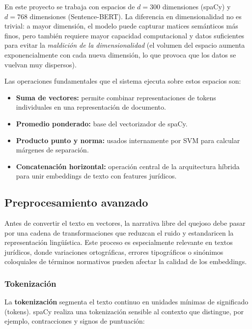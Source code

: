 En este proyecto se trabaja con espacios de $d = 300$ dimensiones (spaCy) y
$d = 768$ dimensiones (Sentence-BERT). La diferencia en dimensionalidad no es
trivial: a mayor dimensión, el modelo puede capturar matices semánticos más
finos, pero también requiere mayor capacidad computacional y datos suficientes
para evitar la \textit{maldición de la dimensionalidad} (el volumen del espacio aumenta exponencialmente con cada nueva dimensión, lo que provoca que los datos se vuelvan muy dispersos).

Las operaciones fundamentales que el sistema ejecuta sobre estos espacios son:

\begin{itemize}
  \item \textbf{Suma de vectores:} permite combinar representaciones de tokens
        individuales en una representación de documento.
  \item \textbf{Promedio ponderado:} base del vectorizador de spaCy.
  \item \textbf{Producto punto y norma:} usados internamente por SVM para
        calcular márgenes de separación.
  \item \textbf{Concatenación horizontal:} operación central de la arquitectura
        híbrida para unir embeddings de texto con features jurídicos.
\end{itemize}

\subsection{Preprocesamiento avanzado}

Antes de convertir el texto en vectores, la narrativa libre del quejoso debe
pasar por una cadena de transformaciones que reduzcan el ruido y estandaricen
la representación lingüística. Este proceso es especialmente relevante en textos
jurídicos, donde variaciones ortográficas, errores tipográficos o sinónimos
coloquiales de términos normativos pueden afectar la calidad de los embeddings.

\subsubsection*{Tokenización}

La \textbf{tokenización} segmenta el texto continuo en unidades mínimas de
significado (tokens). spaCy realiza una tokenización sensible al contexto que
distingue, por ejemplo, contracciones y signos de puntuación:


